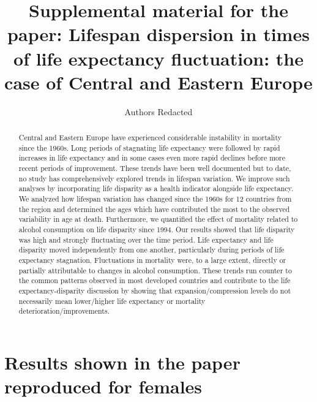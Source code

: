 \documentclass{article}
\title{Supplemental material for the paper: Lifespan dispersion in times of life expectancy fluctuation: the case of Central and Eastern Europe}
\author[]{Authors Redacted}
\date{}
\begin{document}
\maketitle

\begin{abstract}
Central and Eastern Europe have experienced considerable instability in mortality since the 1960s. Long periods of stagnating life expectancy were followed by rapid increases in life expectancy and in some cases even more rapid declines before more recent periods of improvement. These trends have been well documented but to date, no study has comprehensively explored trends in lifespan variation.  We improve such analyses by incorporating life disparity as a health indicator alongside life expectancy. We analyzed how lifespan variation has changed since the 1960s for 12 countries from the region and determined the ages which have contributed the most to the observed variability in age at death. Furthermore, we quantified the effect of mortality related to alcohol consumption on life disparity since 1994. Our results showed that life disparity was high and strongly fluctuating over the time period. Life expectancy and life disparity moved independently from one another, particularly during periods of life expectancy stagnation. Fluctuations in mortality were, to a large extent, directly or partially attributable to changes in alcohol consumption. These trends run counter to the common patterns observed in most developed countries and contribute to the life expectancy-disparity discussion by showing that expansion/compression levels do not necessarily mean lower/higher life expectancy or mortality deterioration/improvements. 
\end{abstract}


\newpage


\section*{Results shown in the paper reproduced for females}
\end{document}
